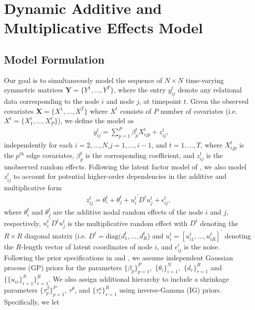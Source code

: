 \documentclass[a4paper]{article}
\begin{document}
		\section{Dynamic Additive and Multiplicative Effects Model}\label{sec: DAME}
\subsection{Model Formulation}\label{subsec: Model formulation}
Our goal is to simultaneously model the sequence of $N \times N$ time-varying symmetric matrices $\mathbf{Y} = \{Y^1,...,Y^T\}$, where the entry $y^t_{ij}$ denote any relational data corresponding to the node $i$ and node $j$, at timepoint $t$. Given the observed covariates $\mathbf{X} = \{X^1,...,X^T\}$ where $X^t$ consists of $P$ number of covariates (i.e. $X^t = \{X^t_1, \ldots, X^t_P\}$), we define the model as
\begin{equation}
\begin{aligned}
&y^t_{ij}=\sum\limits_{p=1}^P \beta^t_{p}X^t_{ijp}+z^t_{ij},
\end{aligned}
\end{equation}
independently for each $i=2,...,N$,$j=1,...,i-1$, and $t = 1,...,T$, where $X^t_{ijp}$ is the $p^{th}$ edge covariates, $\beta^t_{p}$ is the corresponding coefficient, and $z^t_{ij}$ is the unobserved random effects. Following the latent factor model of \cite{minhas2016inferential}, we also model $z^t_{ij}$ to account for potential higher-order dependencies in the additive and multiplicative form
\begin{equation}
\begin{aligned}
z^t_{ij} = \theta^t_{i}+\theta^t_{j}+{{u^t_{i}}^\prime D^{t} u^t_{j}}+\epsilon^t_{ij},
\end{aligned}
\end{equation}
where $\theta^t_{i}$ and $\theta^t_{j}$ are the additive nodal random effects of the node $i$ and $j$, respectively, ${{u^t_{i}}^\prime D^{t} u^t_{j}}$ is the multiplicative random effect with $D^{t}$ denoting the $R\times R$ diagonal matrix (i.e. $D^{t}= \mbox{diag}(d^t_{1},...,d^t_{R}$) and $u^t_{i}=[u^t_{i1},...,u^t_{iR}]^\prime$ denoting the $R$-length vector of latent coordinates of node $i$, and $\epsilon^t_{ij}$ is the noise.\\ \newline
Following the prior specifications in \cite{bhattacharya2011sparse} and \cite{durante2013nonparametric}, we assume independent Gaussian process (GP) priors for the parameters $\{\beta_{p}\}_{p=1}^P,$ $\{\theta_{i}\}_{i=1}^N,$ $\{d_{r}\}_{r=1}^R$ and $\{\{u_{ir}\}_{i=1}^N\}_{r=1}^R$. We also assign additional hierarchy to include a shrinkage parameters $\{\tau^{\beta}_p\}_{p=1}^P$, $\tau^{\theta}$, and $\{\tau^{u}_r\}_{r=1}^R$ using inverse-Gamma (IG) priors. Specifically, we let 
\end{document}
